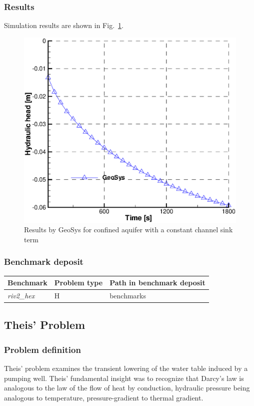 \subsubsection*{Results}
%
Simulation results are shown in Fig.~\ref{GW_Results_ChannelSink}.
%
\begin{figure} [htb!]
 \centering
\includegraphics[width=0.6\columnwidth] {H_GW/figures/riv2_hex_point.eps}
\caption{Results by GeoSys for confined aquifer with a constant channel sink term}
 \label{GW_Results_ChannelSink}
\end{figure}
%
\subsubsection*{Benchmark deposit}
%
\begin{tabular}{|l|l|l|}
  \hline
  Benchmark & Problem type & Path in benchmark deposit \\
  \hline
  \emph{riv2\_hex} & H & benchmarks\verb \GROUNDWATER_FLOW\ \\
  \hline
\end{tabular}
%
%
\subsection{Theis' Problem}
%
\subsubsection*{Problem definition}
%
Theis' problem examines the transient lowering of the water table induced by a pumping well. Theis' fundamental insight was to recognize that Darcy's law is analogous to the law of the flow of heat by conduction, hydraulic pressure being analogous to temperature, pressure-gradient to thermal gradient.
%
